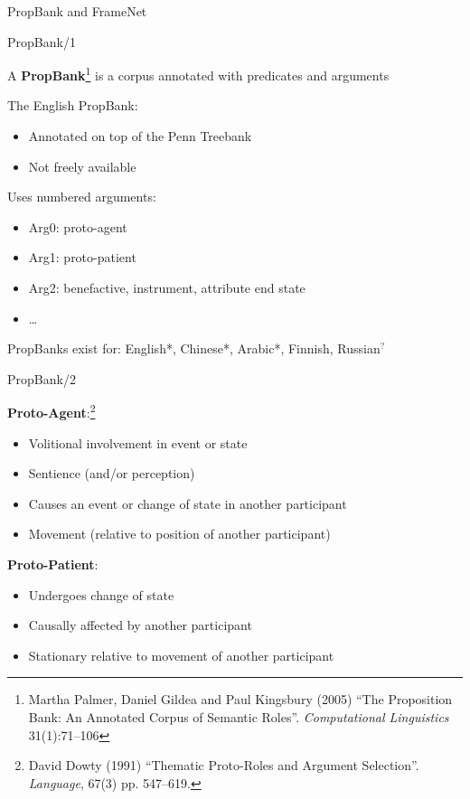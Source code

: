 \documentclass[10pt, compress]{beamer}
\begin{document}
\begin{frame}[standout]
  PropBank and FrameNet
\end{frame}


\begin{frame}{PropBank/1}

A \textbf{PropBank}\footnote{Martha Palmer, Daniel Gildea and Paul Kingsbury (2005) ``The Proposition Bank: An Annotated Corpus of Semantic Roles''. \emph{Computational Linguistics} 31(1):71--106} is a corpus annotated with predicates and arguments

The English PropBank:
\begin{itemize}
  \item Annotated on top of the Penn Treebank
  \item Not freely available 
\end{itemize}

Uses numbered arguments:
  \begin{itemize}
    \item Arg0: {\sc proto-agent}
    \item Arg1: {\sc proto-patient}
    \item Arg2: {\sc benefactive}, {\sc instrument}, {\sc attribute} {\sc end state}
    \item \ldots
  \end{itemize}  

PropBanks exist for: English*, Chinese*, Arabic*, Finnish, Russian$^?$

\end{frame}

\begin{frame}{PropBank/2}
  
\textbf{Proto-Agent}:\footnote{David Dowty (1991) ``Thematic Proto-Roles and Argument Selection''. \emph{Language}, 67(3) pp. 547--619.}
\begin{itemize}
 \item Volitional involvement in event or state
 \item Sentience (and/or perception)
 \item Causes an event or change of state in another participant 
 \item Movement (relative to position of another participant)
\end{itemize}

\textbf{Proto-Patient}:
\begin{itemize}
 \item Undergoes change of state
 \item Causally affected by another participant 
 \item Stationary relative to movement of another participant
\end{itemize}


\end{frame}
\end{document}
